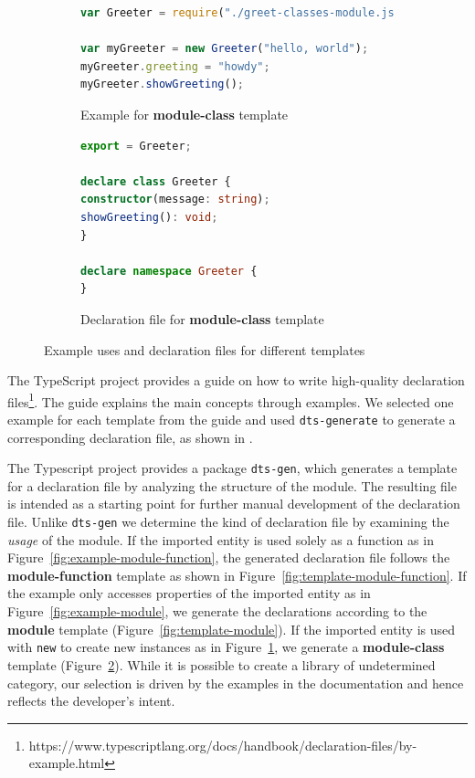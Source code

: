 \documentclass[sigconf]{acmart}
\begin{document}
\begin{figure}[t]
  \begin{subfigure}[t]{0.48\linewidth}
    \begin{lstlisting}[language=JavaScript,numbers=none]
var Greeter = require("./greet-classes-module.js");

var myGreeter = new Greeter("hello, world");
myGreeter.greeting = "howdy";
myGreeter.showGreeting();
    \end{lstlisting}
    \caption{Example for \textbf{module-class} template}
    \label{fig:example-class}
  \end{subfigure}
  \hfill
  \begin{subfigure}[t]{0.48\linewidth}
    \begin{lstlisting}[language=TypeScript,numbers=none]
export = Greeter;

declare class Greeter {
constructor(message: string);
showGreeting(): void;
}

declare namespace Greeter {
}
    \end{lstlisting}
    \caption{Declaration file for \textbf{module-class} template}
    \label{fig:template-class}
  \end{subfigure}

\caption{Example uses and declaration files for different templates}
\label{fig:typescript-templates-by-example}
\end{figure}

The TypeScript project provides a guide on how to write high-quality declaration
files\footnote{https://www.typescriptlang.org/docs/handbook/declaration-files/by-example.html}. The guide
explains the main concepts through examples. We selected one example for each template
from the guide and
used \texttt{dts-generate} to generate a corresponding declaration file, as shown in
.

The Typescript project provides a package \texttt{dts-gen}, which
generates a template for a declaration file by analyzing the structure
of the module. The resulting file is intended as a starting point for further
manual development of the declaration file. 
Unlike \texttt{dts-gen} we determine the kind of declaration file by
examining the \emph{usage} of the module. If the imported entity is
used solely as a function as in
Figure~\ref{fig:example-module-function}, the 
generated declaration file follows the \textbf{module-function}
template as shown in Figure~\ref{fig:template-module-function}. 
If the example only accesses properties of the imported entity as in
Figure~\ref{fig:example-module}, we generate the declarations
according to the \textbf{module} template
(Figure~\ref{fig:template-module}). 
If the imported entity is used with \lstinline/new/ to create new instances as in
Figure~\ref{fig:example-class}, we generate a \textbf{module-class} template (Figure~\ref{fig:template-class}).
While it is possible to create a library of undetermined category, our selection is driven
by the examples in the documentation and 
hence reflects the developer's intent.
\end{document}

